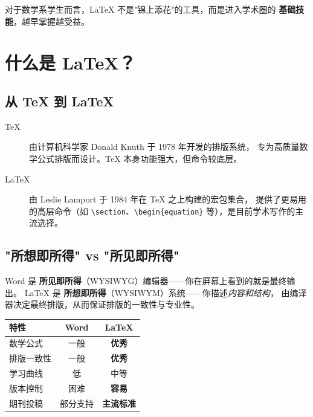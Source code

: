 \documentclass[12pt, a4paper]{article}
\begin{document}
\begin{tipbox}[小结]
    对于数学系学生而言，\LaTeX{} 不是"锦上添花"的工具，而是进入学术圈的
    \textbf{基础技能}，越早掌握越受益。
\end{tipbox}

\section{什么是 \LaTeX{}？}

\subsection{从 \TeX{} 到 \LaTeX{}}

\begin{description}
    \item[\TeX{}]
        由计算机科学家 Donald Knuth 于 1978 年开发的排版系统，
        专为高质量数学公式排版而设计。\TeX{} 本身功能强大，但命令较底层。
    \item[\LaTeX{}]
        由 Leslie Lamport 于 1984 年在 \TeX{} 之上构建的宏包集合，
        提供了更易用的高层命令（如 \verb|\section|、\verb|\begin{equation}|
        等），是目前学术写作的主流选择。
\end{description}

\subsection{"所想即所得" vs "所见即所得"}

Word 是 \textbf{所见即所得}（WYSIWYG）编辑器——你在屏幕上看到的就是最终输出。
\LaTeX{} 是 \textbf{所想即所得}（WYSIWYM）系统——你描述\emph{内容和结构}，
由编译器决定最终排版，从而保证排版的一致性与专业性。

\begin{center}
\begin{tabular}{lcc}
    \toprule
    特性 & Word & \LaTeX{} \\
    \midrule
    数学公式 & 一般 & \textbf{优秀} \\
    排版一致性 & 一般 & \textbf{优秀} \\
    学习曲线 & 低 & 中等 \\
    版本控制 & 困难 & \textbf{容易} \\
    期刊投稿 & 部分支持 & \textbf{主流标准} \\
    \bottomrule
\end{tabular}
\end{center}
\end{document}
